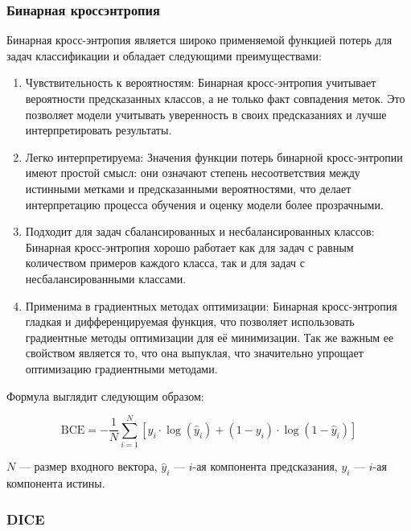 \subsubsection{Бинарная кроссэнтропия}

Бинарная кросс-энтропия является широко применяемой функцией потерь для задач
классификации и обладает следующими преимуществами:

\begin{enumerate}
	\item Чувствительность к вероятностям: Бинарная кросс-энтропия учитывает
	вероятности предсказанных классов, а не только факт совпадения меток. Это
	позволяет модели учитывать уверенность в своих предсказаниях и лучше
	интерпретировать результаты.

	\item Легко интерпретируема: Значения функции потерь бинарной
	кросс-энтропии имеют простой смысл: они означают степень несоответствия
	между истинными метками и предсказанными вероятностями, что делает
	интерпретацию процесса обучения и оценку модели более прозрачными.

	\item Подходит для задач сбалансированных и несбалансированных классов:
	Бинарная кросс-энтропия хорошо работает как для задач с равным количеством
	примеров каждого класса, так и для задач с несбалансированными классами.

	\item Применима в градиентных методах оптимизации: Бинарная кросс-энтропия
	гладкая и дифференцируемая функция, что позволяет использовать градиентные
	методы оптимизации для её минимизации. Так же важным ее свойством является
	то, что она выпуклая, что значительно упрощает оптимизацию градиентными
	методами.


\end{enumerate}

Формула выглядит следующим образом:

\begin{equation}
	\text{BCE} = - \frac{1}{N} \sum_{i=1}^{N} \left[ y_i \cdot \log(\hat{y}_i) + (1 - y_i)
		\cdot \log(1 - \hat{y}_i) \right]
	\label{eq:bce}
\end{equation}

\noindent $N$ --- размер входного вектора, $\hat{y}_i$ --- $i$-ая компонента
предсказания, $y_i$ --- $i$-ая компонента истины.

\subsubsection{DICE}

